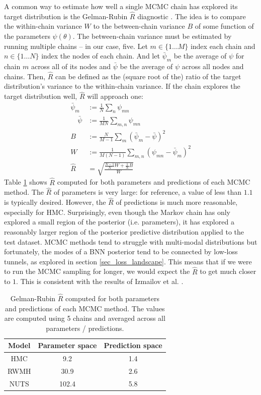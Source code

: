 \documentclass[12pt]{article}
\begin{document}
A common way to estimate how well a single MCMC chain has explored its target distribution is the Gelman-Rubin $\hat{R}$ diagnostic \cite{r_hat}. The idea is to compare the within-chain variance $W$ to the between-chain variance $B$ of some function of the parameters $\psi (\theta)$. The between-chain variance must be estimated by running multiple chains -- in our case, five. Let $m \in \{1 \ldots M\}$ index each chain and $n \in \{1 \ldots N\}$ index the nodes of each chain. And let $\bar{\psi}_m$ be the average of $\psi$ for chain $m$ across all of its nodes and $\bar{\psi}$ be the average of $\psi$ across all nodes and chains. Then, $\hat{R}$ can be defined as the (square root of the) ratio of the target distribution's variance to the within-chain variance. If the chain explores the target distribution well, $\hat{R}$ will approach one:
\begin{align}
\bar{\psi}_m &:= \frac{1}{N} \sum_{n} \psi_{m n} \\
\quad \bar{\psi} &:= \frac{1}{M N} \sum_{m, n} \psi_{m n} \\
B &:= \frac{N}{M-1} \sum_{m} (\bar{\psi}_m-\bar{\psi})^2 \\
W &:= \frac{1}{M(N-1)} \sum_{m, n} (\psi_{m n}-\bar{\psi}_m)^{2} \\
\hat{R} &= \sqrt{\frac{\frac{N-1}{N} W+\frac{1}{N} B}{W}}
\end{align}
Table \ref{table_r_hat} shows $\hat{R}$ computed for both parameters and predictions of each MCMC method. The $\hat{R}$ of parameters is very large: for reference, a value of less than $1.1$ is typically desired. However, the $\hat{R}$ of predictions is much more reasonable, especially for HMC. Surprisingly, even though the Markov chain has only explored a small region of the posterior (i.e. parameters), it has explored a reasonably larger region of the posterior predictive distribution applied to the test dataset. MCMC methods tend to struggle with multi-modal distributions but fortunately, the modes of a BNN posterior tend to be connected by low-loss tunnels, as explored in section \ref{sec_loss_landscape}. This means that if we were to run the MCMC sampling for longer, we would expect the $\hat{R}$ to get much closer to $1$. This is consistent with the results of Izmailov et al. \cite{bnn_posterior}.

\begin{table}[H]
\centering
\begin{tabular}{|c|c|c|}
\hline
Model & Parameter space & Prediction space \\ \hline
HMC   & 9.2             & 1.4              \\ \hline
RWMH  & 30.9            & 2.6              \\ \hline
NUTS  & 102.4           & 5.8              \\ \hline
\end{tabular}
\caption{Gelman-Rubin $\hat{R}$ computed for both parameters and predictions of each MCMC method. The values are computed using 5 chains and averaged across all parameters / predictions.}
\label{table_r_hat}
\end{table}
\end{document}
